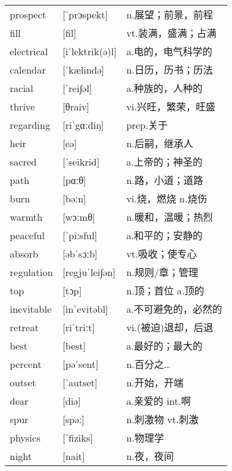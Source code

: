 \documentclass[a4paper]{article}
\begin{document}
\section{}
\begin{tabular}{l l l}

prospect & [ˈprɔspekt] & n.展望；前景，前程 \\
fill & [fil] & vt.装满，盛满；占满 \\
electrical & [iˈlektrik(ə)l] & a.电的，电气科学的 \\
calendar & [ˈkælində] & n.日历，历书；历法 \\
racial & [ˈrei∫əl] & a.种族的，人种的 \\
thrive & [θraiv] & vi.兴旺，繁荣，旺盛 \\
regarding & [riˈgɑːdiŋ] & prep.关于 \\
heir & [eə] & n.后嗣，继承人 \\
sacred & [ˈseikrid] & a.上帝的；神圣的 \\
path & [pɑːθ] & n.路，小道；道路 \\
burn & [bəːn] & vi.烧，燃烧 n.烧伤 \\
warmth & [wɔːmθ] & n.暖和，温暖；热烈 \\
peaceful & [ˈpiːsful] & a.和平的；安静的 \\
absorb & [əbˈsɔːb] & vt.吸收；使专心 \\
regulation & [regjuˈlei∫ən] & n.规则/章；管理 \\
top & [tɔp] & n.顶；首位 a.顶的 \\
inevitable & [inˈevitəbl] & a.不可避免的，必然的 \\
retreat & [riˈtriːt] & vi.(被迫)退却，后退 \\
best & [best] & a.最好的；最大的 \\
percent & [pəˈsent] & n.百分之… \\
outset & [ˈautset] & n.开始，开端 \\
dear & [diə] & a.亲爱的 int.啊 \\
spur & [spəː] & n.刺激物 vt.刺激 \\
physics & [ˈfiziks] & n.物理学 \\
night & [nait] & n.夜，夜间 \\

\end{tabular}
\end{document}
